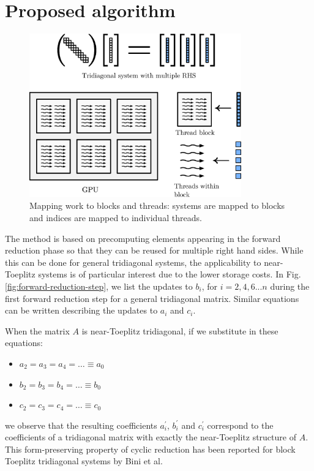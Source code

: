 \documentclass{elsarticle}
\begin{document}
\section{Proposed algorithm} \label{sec:proposed-algorithm}

\begin{figure}[h!]
\begin{center}
\includegraphics[height=200pt]{img/gpu-mapping.eps}
\end{center}
\label{fig:gpu-mapping}
\caption{Mapping work to blocks and threads:
systems are mapped to blocks and
indices are mapped to individual threads.}
\end{figure}

The method is based on precomputing elements 
appearing in the forward reduction phase
so that they can be reused for multiple right hand sides.
While this can be done for general tridiagonal systems,
the applicability to near-Toeplitz systems is
of particular interest due to the lower storage costs.
In Fig. \ref{fig:forward-reduction-step},
we list the updates to
$b_i$, for $i=2, 4, 6 ... n$
during the first forward reduction step
for a general tridiagonal matrix.
Similar equations can be written describing
the updates to $a_i$ and  $c_i$.

When the matrix $A$ is near-Toeplitz tridiagonal,
if we substitute in these equations:

\begin{itemize}
    \item [] $a_2 = a_3 = a_4 = \hdots \equiv a_0$
    \item [] $b_2 = b_3 = b_4 = \hdots \equiv b_0$
    \item [] $c_2 = c_3 = c_4 = \hdots \equiv c_0$
\end{itemize}
%
we observe that the resulting coefficients
$a_i^\prime$, $b_i^\prime$ and $c_i^\prime$
correspond to the coefficients of a tridiagonal matrix with
exactly the near-Toeplitz structure of $A$.
This form-preserving property of cyclic reduction
has been reported for block Toeplitz tridiagonal systems
by Bini et al.
\end{document}
